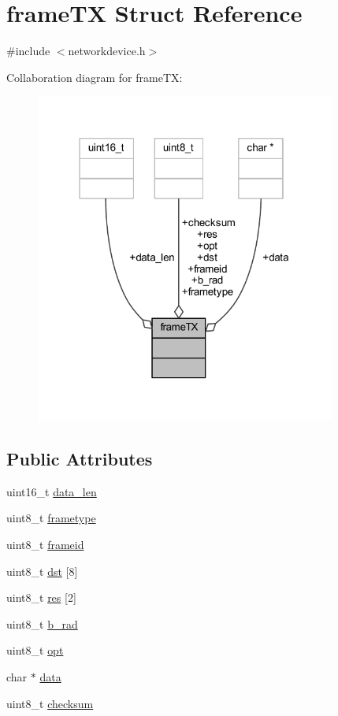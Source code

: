 \hypertarget{structframe_t_x}{}\section{frame\+TX Struct Reference}
\label{structframe_t_x}


{\ttfamily \#include $<$networkdevice.\+h$>$}



Collaboration diagram for frame\+TX\+:
\nopagebreak
\begin{figure}[H]
\begin{center}
\leavevmode
\includegraphics[width=280pt]{structframe_t_x__coll__graph}
\end{center}
\end{figure}
\subsection*{Public Attributes}
\begin{DoxyCompactItemize}
\item 
uint16\+\_\+t \hyperlink{structframe_t_x_ae97c6c32cae2233e9a532f3f18acb87a}{data\+\_\+len}
\item 
uint8\+\_\+t \hyperlink{structframe_t_x_ae0184264e132f9acfedd9d73e067d749}{frametype}
\item 
uint8\+\_\+t \hyperlink{structframe_t_x_a81728989f69fb448c3107efe57d9acee}{frameid}
\item 
uint8\+\_\+t \hyperlink{structframe_t_x_ac6af0f89587bfdd91eabbc1664ed0b18}{dst} \mbox{[}8\mbox{]}
\item 
uint8\+\_\+t \hyperlink{structframe_t_x_aaa8e3f6c37ba7164586ece2aa05d02d1}{res} \mbox{[}2\mbox{]}
\item 
uint8\+\_\+t \hyperlink{structframe_t_x_a9902ea07b8e5fc897038c4a78c052d46}{b\+\_\+rad}
\item 
uint8\+\_\+t \hyperlink{structframe_t_x_a683e80dc13eeb1ab084dcc79deea00a1}{opt}
\item 
char $\ast$ \hyperlink{structframe_t_x_a03427b6b3acbd35f51927438a3366cb5}{data}
\item 
uint8\+\_\+t \hyperlink{structframe_t_x_ac11d9bcebc8ed64242ac82e05b1bcf43}{checksum}
\end{DoxyCompactItemize}


